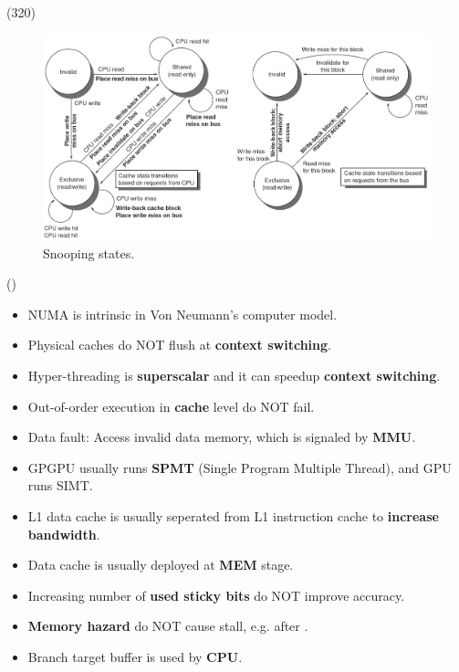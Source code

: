 \item \begin{theorem}{(320)} \quad\quad
    \begin{figure}[H]
        \centering
        \includegraphics[scale=0.5]{img/snooping.png}
        \caption{Snooping states.}
        \label{img:snooping}
    \end{figure}
\end{theorem}

\item \begin{theorem}{()} \quad\quad \begin{itemize}
        \item NUMA is intrinsic in Von Neumann's computer model.
        \item Physical caches do NOT flush at \textbf{context switching}.
        \item Hyper-threading is \textbf{superscalar} and it can speedup \textbf{context switching}.
        \item Out-of-order execution in \textbf{cache} level do NOT fail.
        \item Data fault: Access invalid data memory, which is signaled by \textbf{MMU}.
        \item GPGPU usually runs \textbf{SPMT} (Single Program Multiple Thread), and GPU runs SIMT.
        \item L1 data cache is usually seperated from L1 instruction cache to \textbf{increase bandwidth}.
        \item Data cache is usually deployed at \textbf{MEM} stage.
        \item Increasing number of \textbf{used sticky bits} do NOT improve accuracy.
        \item \textbf{Memory hazard }do NOT cause stall, e.g.  after .
        \item Branch target buffer is used by \textbf{CPU}.
    \end{itemize}
\end{theorem}
